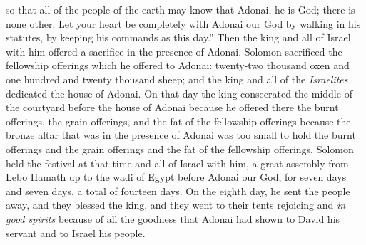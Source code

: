 \begin{biblechapter}
\verse so that all of the people of the earth may know that Adonai, he is God; there is none other.
\verse Let your heart be completely with Adonai our God by walking in his statutes, by keeping his commands as this day.”
 Then the king and all of Israel with him offered a sacrifice in the presence of Adonai.
\verse Solomon sacrificed the fellowship offerings which he offered to Adonai: twenty-two thousand oxen and one hundred and twenty thousand sheep; and the king and all of the \textit{Israelites} dedicated the house of Adonai.
\verse On that day the king consecrated the middle of the courtyard before the house of Adonai because he offered there the burnt offerings, the grain offerings, and the fat of the fellowship offerings because the bronze altar that was in the presence of Adonai was too small to hold the burnt offerings and the grain offerings and the fat of the fellowship offerings.
\verse Solomon held the festival at that time and all of Israel with him, a great assembly from Lebo Hamath up to the wadi of Egypt before Adonai our God, for seven days and seven days, a total of fourteen days.
\verse On the eighth day, he sent the people away, and they blessed the king, and they went to their tents rejoicing and \textit{in good spirits} because of all the goodness that Adonai had shown to David his servant and to Israel his people.
\end{biblechapter}

